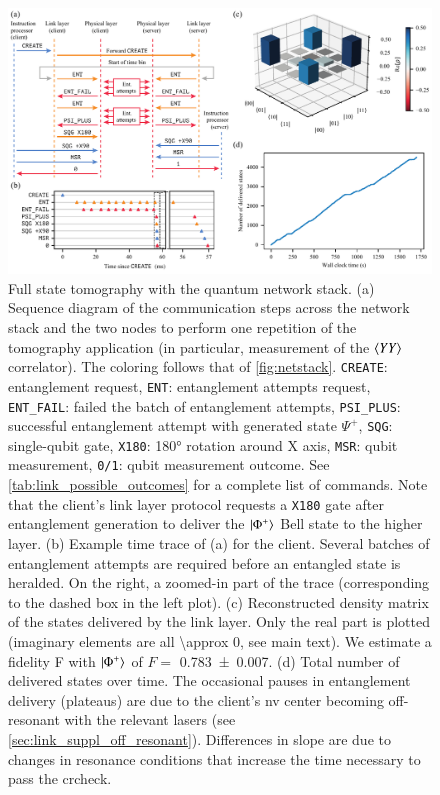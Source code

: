 \begin{figure}
    \centering
    \includegraphics[width=\linewidth]{figures/fstomography.pdf}
    \caption{
        Full state tomography with the quantum network stack.
        (a) Sequence diagram of the communication steps across the network stack and the two nodes
        to perform one repetition of the tomography application (in particular, measurement of the
        $\braket{YY}$ correlator). The coloring follows that of \cref{fig:netstack}.
        \texttt{CREATE}: entanglement request, \texttt{ENT}: entanglement attempts request,
        \texttt{ENT\_FAIL}: failed the batch of entanglement attempts, \texttt{PSI\_PLUS}:
        successful entanglement attempt with generated state $\Psi^+$, \texttt{SQG}: single-qubit
        gate, \texttt{X180}: \ang{180} rotation around X axis, \texttt{MSR}: qubit measurement,
        \texttt{0/1}: qubit measurement outcome. See \cref{tab:link_possible_outcomes} for a
        complete list of commands. Note that the client's link layer protocol requests a
        \texttt{X180} gate after entanglement generation to deliver the $\ket{\Phi^+}$ Bell state to
        the higher layer.
        (b) Example time trace of (a) for the client. Several batches of entanglement attempts are
        required before an entangled state is heralded. On the right, a zoomed-in part of the trace
        (corresponding to the dashed box in the left plot).
        (c) Reconstructed density matrix of the states delivered by the link layer. Only the real
        part is plotted (imaginary elements are all \num{\approx 0}, see main text). We estimate a
        fidelity F with $\ket{\Phi^+}$ of $F =$ \num{0.783(7)}.
        (d) Total number of delivered states over time. The occasional pauses in entanglement
        delivery (plateaus) are due to the client's \acrshort{nv} center becoming off-resonant with
        the relevant lasers (see \cref{sec:link_suppl_off_resonant}). Differences in slope are due
        to changes in resonance conditions that increase the time necessary to pass the
        \acrlong{crcheck}.
    }
    \label{fig:fstomography}
\end{figure}

